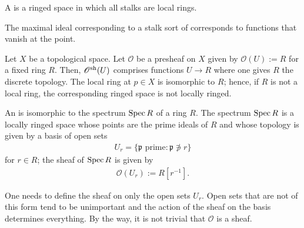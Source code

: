 \documentclass [11 pt, oneside, margin = 1 in] {article}
\begin{document}
\begin{definition}[ ]\label{}\text{}
A  is a ringed space in which all stalks are local rings.
\end{definition}

\begin{remark}
	The maximal ideal corresponding to a stalk sort of corresponds to functions that vanish at the point.
\end{remark}

\begin{example}\label{}\text{}
Let $X$ be a topological space. Let $\mathscr{O}$ be a presheaf on $X$ given by $\mathscr{O}(U) := R$ for a fixed ring $R$. Then, $\mathscr{O}\textsuperscript{sh}(U)$ comprises functions $U\longrightarrow R$ where one gives $R$ the discrete topology. The local ring at $p\in X$ is isomorphic to $R$; hence, if $R$ is not a local ring, the corresponding ringed space is not locally ringed. 
\end{example}

\begin{definition}[ ]\label{}\text{}
An  is isomorphic to the spectrum $\operatorname{Spec} R$ of a ring $R$. The spectrum $\operatorname{Spec} R$ is a locally ringed space whose points are the prime ideals of $R$ and whose topology is given by a basis of open sets
\begin{align*}
	U_r = \{\mathfrak{p} \textrm{ prime}: \mathfrak{p}\not\ni r\}
\end{align*}
for $r\in R$; the sheaf of $\operatorname{Spec} R$ is given by
\begin{align*}
	\mathscr{O}(U_r) := R[r ^{-1}].
\end{align*}
\end{definition}

\begin{remark}
	One needs to define the sheaf on only the open sets $U_r$. Open sets that are not of this form tend to be unimportant and the action of the sheaf on the basis determines everything. By the way, it is not trivial that $\mathscr{O}$ is a sheaf.
\end{remark}
\end{document}
